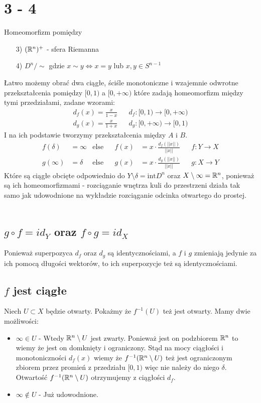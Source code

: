 \section*{3 - 4}
Homeomorfizm pomiędzy
\begin{itemize}
  \item[3)] $({\mathbb{R}}^n)^+$ - sfera Riemanna
  \item[4)] $D ^ {n} / \sim $ gdzie $ x \sim y \iff x = y $ lub $ x, y \in S^{n-1} $
\end{itemize}
Łatwo możemy obrać dwa ciągłe, ściśle monotoniczne i wzajemnie odwrotne przekształcenia pomiędzy $[0, 1)$ a $[0, +\infty)$ które zadają homeomorfizm między tymi przedziałami, zadane wzorami:
\begin{align*}
  d_f(x) = \tfrac{x}{1 - x} & & d_f : [0, 1) \to [0, +\infty) \\
  d_g(x) = \tfrac{x}{1 + x} & & d_g : [0, +\infty) \to [0, 1)
\end{align*}
I na ich podstawie tworzymy przekształcenia między $A$ i $B$.
\begin{align*}
  f(\delta) &= \infty & \text{else} & & f(x) &= x \cdot \tfrac{d_f(||x||)}{||x||} & & f : Y \to X \\
  g(\infty) &= \delta & \text{else} & & g(x) &= x \cdot \tfrac{d_g(||x||)}{||x||} & & g : X \to Y
\end{align*}
Które są ciągłe obcięte odpowiednio do $ Y \setminus \delta =  \text{int}{D^n}$ oraz $X \setminus \infty = {\mathbb{R}}^n$, ponieważ są ich homeomorfizmami - rozciąganie wnętrza kuli do przestrzeni działa tak samo jak udowodnione na wykładzie rozciąganie odcinka otwartego do prostej. \\
\\
\subsection*{$g \circ f = id_Y$ oraz $f \circ g = id_X$}
Ponieważ superpozyca $d_f$ oraz $d_g$ są identycznościami, a $f$ i $g$ zmieniają jedynie za ich pomocą długości wektorów, to ich superpozycje też są identycznościami.
\subsection*{$f$ jest ciągłe}
Niech $ U \subset X$ będzie otwarty. Pokażmy że $f^{-1}(U)$ też jest otwarty. Mamy dwie możliwości:
\begin{itemize}
  \item $\infty \in U$ - Wtedy ${\mathbb{R}}^n \setminus U$ jest zwarty. Ponieważ jest on podzbiorem ${\mathbb{R}}^n$ to wiemy że jest on domknięty i ograniczony. Stąd na mocy ciągłości i monotoniczności $d_f(x)$ wiemy że $f^{-1}({\mathbb{R}}^n \setminus U)$ też jest ograniczonym zbiorem przez promień z przedziału $[0,1)$ więc nie należy do niego $\delta$. Otwartość $f^{-1}({\mathbb{R}}^n \setminus U)$ otrzymujemy z ciągłości $d_f$.
  \item $\infty \not \in U$ - Już udowodnione.
\end{itemize}
